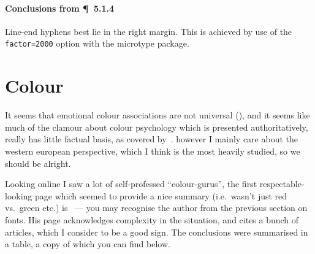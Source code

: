 \documentclass[solid,math,chem,code,plot,gloss]{bmc}
\begin{document}
\paragraph{Conclusions from \P~5.1.4}
Line-end hyphens best lie in the right margin. This is achieved by use of the
\texttt{factor=2000} option with the microtype package.

\section{Colour}

It seems that emotional colour associations are not universal (\cite{Laurence1991}),
and it seems like much of the clamour about colour psychology which is presented
authoritatively, really has little factual basis, as covered by~\cite{OConnnor2011}.
however I mainly care about the western european perspective, which I think is
the most heavily studied, so we should be alright.

Looking online I saw a lot of self-professed ``colour-gurus'', the first
respectable-looking page which seemed to provide a nice summary
(i.e.\ wasn't just red vs.\ green etc.) is~\cite{web_colour} — you may recognise the
author from the previous section on fonts.
His page acknowledges complexity in the situation, and cites a bunch of articles,
which I consider to be a good sign.
The conclusions were summarised in a table, a copy of which you can find below.
\end{document}
